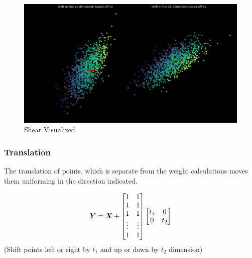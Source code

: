 \begin{figure}[h!]
\begin{center}
\includegraphics{students/SP19_DL_Lab_1_Notes/images/shear.png}
\end{center} 
\caption{Shear Visualized}
\label{fig:mon}
\end{figure}
\FloatBarrier

\subsubsection{Translation}
The translation of points, which is separate from the weight calculations moves them uniforming in the direction indicated.

\[ \bm{Y} = \bm{X} 
+ \begin{bmatrix}
    1 & 1 \\
    1 & 1 \\
    1 & 1 \\
    \vdots & \vdots  \\
    1 & 1
\end{bmatrix}
\begin{bmatrix}
    t_1 & 0\\
    0 & t_2
\end{bmatrix} \] 
(Shift points left or right by \(t_1\) and up or down by  \(t_2\) dimension)

